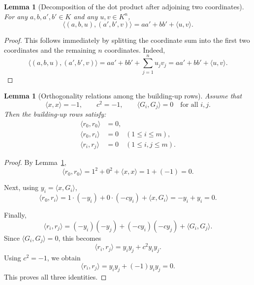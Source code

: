 \documentclass[12pt]{article}
\newtheorem{lemma}[theorem]{Lemma}
\begin{document}
\begin{lemma}[Decomposition of the dot product after adjoining two coordinates]
\label{lem:prepend-dot}
For any $a,b,a',b'\in K$ and any $u,v\in K^n$,
\[
\langle (a,b,u),(a',b',v)\rangle
=
aa' + bb' + \langle u,v\rangle.
\]
\end{lemma}

\begin{proof}
This follows immediately by splitting the coordinate sum into the first two coordinates and the remaining $n$ coordinates. Indeed,
\[
\langle (a,b,u),(a',b',v)\rangle
=
aa' + bb' + \sum_{j=1}^n u_j v_j
=
aa' + bb' + \langle u,v\rangle.
\]

\end{proof}

\begin{lemma}[Orthogonality relations among the building-up rows]
\label{lem:row-orthogonality}
Assume that
\[
\langle x,x\rangle = -1,
\qquad
c^2 = -1,
\qquad
\langle G_i,G_j\rangle = 0 \quad \text{for all } i,j.
\]
Then the building-up rows satisfy:
\begin{align*}
\langle r_0,r_0\rangle &= 0,\\
\langle r_0,r_i\rangle &= 0 \quad (1\le i\le m),\\
\langle r_i,r_j\rangle &= 0 \quad (1\le i,j\le m).
\end{align*}
\end{lemma}

\begin{proof}
By Lemma~\ref{lem:prepend-dot},
\[
\langle r_0,r_0\rangle
=
1^2 + 0^2 + \langle x,x\rangle
=
1+(-1)=0.
\]

Next, using $y_i=\langle x,G_i\rangle$,
\[
\langle r_0,r_i\rangle
=
1\cdot(-y_i)+0\cdot(-c y_i)+\langle x,G_i\rangle
=
-y_i+y_i=0.
\]

Finally,
\[
\langle r_i,r_j\rangle
=
(-y_i)(-y_j)+(-c y_i)(-c y_j)+\langle G_i,G_j\rangle.
\]
Since $\langle G_i,G_j\rangle=0$, this becomes
\[
\langle r_i,r_j\rangle
=
y_i y_j + c^2 y_i y_j.
\]
Using $c^2=-1$, we obtain
\[
\langle r_i,r_j\rangle
=
y_i y_j + (-1)y_i y_j
=
0.
\]
This proves all three identities. 
\end{proof}
\end{document}

